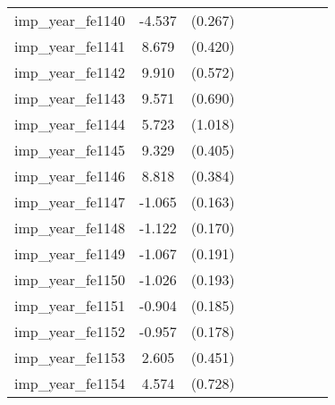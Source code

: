 {\begin{tabular}{l*{4}{cc}}
imp\_year\_fe1140&   -4.537\sym{***}&  (0.267)&                  &         &                  &         &                  &         \\
imp\_year\_fe1141&    8.679\sym{***}&  (0.420)&                  &         &                  &         &                  &         \\
imp\_year\_fe1142&    9.910\sym{***}&  (0.572)&                  &         &                  &         &                  &         \\
imp\_year\_fe1143&    9.571\sym{***}&  (0.690)&                  &         &                  &         &                  &         \\
imp\_year\_fe1144&    5.723\sym{***}&  (1.018)&                  &         &                  &         &                  &         \\
imp\_year\_fe1145&    9.329\sym{***}&  (0.405)&                  &         &                  &         &                  &         \\
imp\_year\_fe1146&    8.818\sym{***}&  (0.384)&                  &         &                  &         &                  &         \\
imp\_year\_fe1147&   -1.065\sym{***}&  (0.163)&                  &         &                  &         &                  &         \\
imp\_year\_fe1148&   -1.122\sym{***}&  (0.170)&                  &         &                  &         &                  &         \\
imp\_year\_fe1149&   -1.067\sym{***}&  (0.191)&                  &         &                  &         &                  &         \\
imp\_year\_fe1150&   -1.026\sym{***}&  (0.193)&                  &         &                  &         &                  &         \\
imp\_year\_fe1151&   -0.904\sym{***}&  (0.185)&                  &         &                  &         &                  &         \\
imp\_year\_fe1152&   -0.957\sym{***}&  (0.178)&                  &         &                  &         &                  &         \\
imp\_year\_fe1153&    2.605\sym{***}&  (0.451)&                  &         &                  &         &                  &         \\
imp\_year\_fe1154&    4.574\sym{***}&  (0.728)&                  &         &                  &         &                  &         \\

\end{tabular}}
